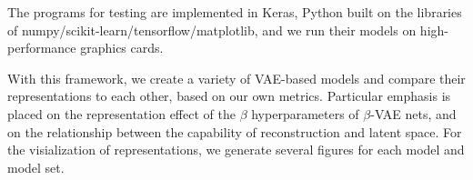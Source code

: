 The programs for testing are implemented in Keras, Python built on the libraries of numpy/scikit-learn/tensorflow/matplotlib, and we run their models on high-performance graphics cards.

With this framework, we create a variety of VAE-based models and compare their representations to each other, based on our own metrics. Particular emphasis is placed on the representation effect of the $\beta$ hyperparameters of $\beta$-VAE nets, and on the relationship between the  capability of reconstruction and latent space. For the visialization of representations, we generate several figures for each model and model set.
\vfill

